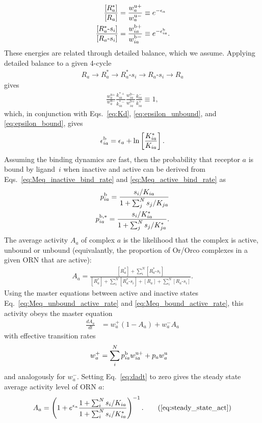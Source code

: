 \documentclass[9pt,twocolumn,twoside,lineno]{pnas-new}
\begin{document}
\begin{align}
\frac{[R^*_a]}{[R_a]} &= \frac{w^{\text{u}+}_a}{w^{\text{u}-}_a} \equiv e^{-\epsilon_a} \label{eq:epsilon_unbound} \\
\frac{[R^*_a\text{-}s_i]}{[R_a\text{-}s_i]} &= \frac{w^{\text{b}+}_{ia}}{w^{\text{b}-}_{ia}} \equiv e^{-\epsilon^{\text b}_{ia}}.\label{eq:epsilon_bound}
\end{align}
These energies are related through detailed balance, which we assume. Applying detailed balance to a given 4-cycle 
\begin{align}
R_a \rightarrow R_a^* \rightarrow R_a^*\text{-}s_i \rightarrow R_a\text{-}s_i \rightarrow R_a
\end{align}
gives
\begin{align}
\frac{w^{\text{u}+}_a}{w^{\text{u}-}_a}\frac{k^{*+}_{ia}}{k^{*-}_{ia}}\frac{w^{\text{b}-}_{ia}}{w^{\text{b}+}_{ia}}\frac{k^{-}_{ia}}{k^{+}_{ia}} \equiv 1,
\label{eq:detailed_balance}
\end{align}
which, in conjunction with Eqs.~\ref{eq:Kd}, \ref{eq:epsilon_unbound}, and \ref{eq:epsilon_bound}, gives
\begin{align}
\epsilon_{ia}^{\text b} = \epsilon_a + \ln\left[\frac{K^*_{ia}}{K_{ia}}\right].
\label{testing_equation}
\end{align}
Assuming the binding dynamics are fast, then the probability that receptor $a$ is bound by ligand~$i$ when inactive and active can be derived from  Eqs.~\ref{eq:Meq_inactive_bind_rate} and \ref{eq:Meq_active_bind_rate} as
\begin{align}
p^{\text b}_{ia} = \frac{s_i/K_{ia}}{1 + \sum_j^Ns_j/K_{ja}} \label{eq:bound_prob_ai_inactive} \\
p^{\text b, *}_{ia} = \frac{s_i/K^*_{ia}}{1 + \sum_j^Ns_j/K^*_{ja}} \label{eq:bound_prob_ai_active}.
\end{align}
The average  activity $A_a$ of complex $a$ is the likelihood that the complex is active, unbound or unbound (equivalantly, the proportion of Or/Orco complexes in a given ORN that are active):
\begin{align}
A_a = \frac{[R^*_a] + \sum_i^N[R^*_a\text{-}s_i]}{[R^*_a] + \sum_i^N[R^*_a\text{-}s_i] + {[R_a] + \sum_i^N[R_a\text{-}s_i]}}.
\end{align} 
Using the master equations between active and inactive states Eq.~\ref{eq:Meq_unbound_active_rate} and \ref{eq:Meq_bound_active_rate}, this activity obeys the master equation
\begin{align}
\frac{dA_a}{dt} &= w^+_a(1 - A_a) + w^-_aA_a
\label{eq:dadt}
\end{align}
with effective transition rates
\begin{align}
w^+_a &= \sum_i^Np^{\text b}_{ia} w^{\text u +}_{ia} + p_{a}w^{\text u}_a 
\end{align}
and analogously for $w_a^-$. Setting Eq.~\ref{eq:dadt} to zero gives the steady state average activity level of ORN $a$:
\begin{align}
A_a = \left(1 + e^{\epsilon_a}\frac{1 + \sum_i^N s_i/K_{ia}}{1 + \sum_i^N s_i/K^*_{ia}}\right)^{-1}. \tag{\ref{eq:steady_state_act}}
\end{align}
\end{document}
